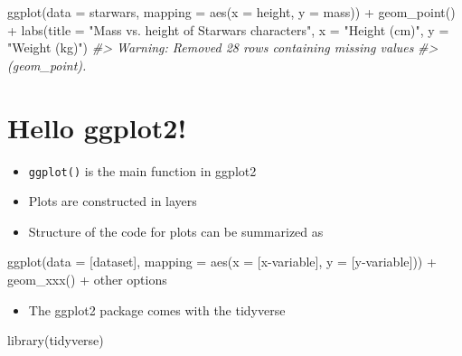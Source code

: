\documentclass[
]{book}
\newenvironment{Shaded}{\begin{snugshade}}{\end{snugshade}}
\newcommand{\AttributeTok}[1]{\textcolor[rgb]{0.77,0.63,0.00}{#1}}
\newcommand{\CommentTok}[1]{\textcolor[rgb]{0.56,0.35,0.01}{\textit{#1}}}
\newcommand{\FunctionTok}[1]{\textcolor[rgb]{0.00,0.00,0.00}{#1}}
\newcommand{\NormalTok}[1]{#1}
\newcommand{\SpecialCharTok}[1]{\textcolor[rgb]{0.00,0.00,0.00}{#1}}
\newcommand{\StringTok}[1]{\textcolor[rgb]{0.31,0.60,0.02}{#1}}
\providecommand{\tightlist}{%
  \setlength{\itemsep}{0pt}\setlength{\parskip}{0pt}}
\theoremstyle{definition}
\theoremstyle{definition}
\theoremstyle{definition}
\theoremstyle{definition}
\theoremstyle{remark}
\begin{document}
\begin{Shaded}
\begin{Highlighting}[]
\FunctionTok{ggplot}\NormalTok{(}\AttributeTok{data =}\NormalTok{ starwars, }\AttributeTok{mapping =} \FunctionTok{aes}\NormalTok{(}\AttributeTok{x =}\NormalTok{ height, }\AttributeTok{y =}\NormalTok{ mass)) }\SpecialCharTok{+}
  \FunctionTok{geom\_point}\NormalTok{() }\SpecialCharTok{+}
  \FunctionTok{labs}\NormalTok{(}\AttributeTok{title =} \StringTok{"Mass vs. height of Starwars characters"}\NormalTok{,}
       \AttributeTok{x =} \StringTok{"Height (cm)"}\NormalTok{, }\AttributeTok{y =} \StringTok{"Weight (kg)"}\NormalTok{)}
\CommentTok{\#\textgreater{} Warning: Removed 28 rows containing missing values}
\CommentTok{\#\textgreater{} (geom\_point).}
\end{Highlighting}
\end{Shaded}

\hypertarget{hello-ggplot2}{%
\section{Hello ggplot2!}\label{hello-ggplot2}}

\begin{itemize}
\tightlist
\item
  \texttt{ggplot()} is the main function in ggplot2
\item
  Plots are constructed in layers
\item
  Structure of the code for plots can be summarized as
\end{itemize}

\begin{Shaded}
\begin{Highlighting}[]
\FunctionTok{ggplot}\NormalTok{(}\AttributeTok{data =}\NormalTok{ [dataset], }
       \AttributeTok{mapping =} \FunctionTok{aes}\NormalTok{(}\AttributeTok{x =}\NormalTok{ [x}\SpecialCharTok{{-}}\NormalTok{variable], }\AttributeTok{y =}\NormalTok{ [y}\SpecialCharTok{{-}}\NormalTok{variable])) }\SpecialCharTok{+}
   \FunctionTok{geom\_xxx}\NormalTok{() }\SpecialCharTok{+}
\NormalTok{   other options}
\end{Highlighting}
\end{Shaded}

\begin{itemize}
\tightlist
\item
  The ggplot2 package comes with the tidyverse
\end{itemize}

\begin{Shaded}
\begin{Highlighting}[]
\FunctionTok{library}\NormalTok{(tidyverse)}
\end{Highlighting}
\end{Shaded}
\end{document}

